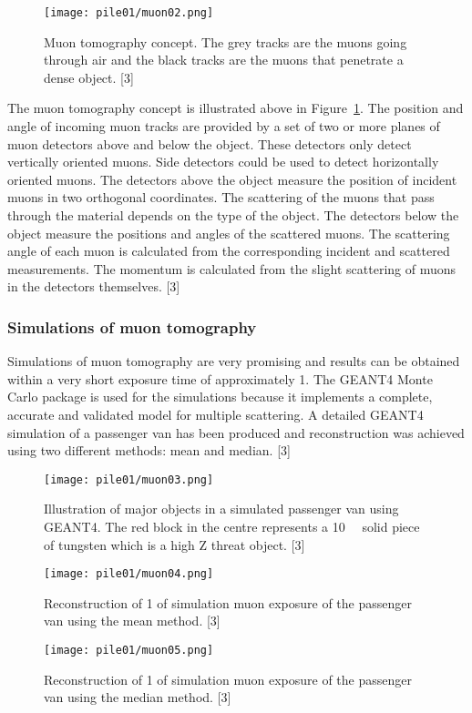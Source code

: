 \documentclass[a4paper]{article}
\begin{document}
\begin{figure}[h!]
  \texttt{[image: pile01/muon02.png]}
  \caption{Muon tomography concept. The grey tracks are the muons going through air and the black
tracks are the muons that penetrate a dense object. [3]}
  \label{muon02}
\end{figure}

The muon tomography concept is illustrated above in Figure~\ref{muon02}. The position and angle of incoming
muon tracks are provided by a set of two or more planes of muon detectors above and below the
object. These detectors only detect vertically oriented muons. Side detectors could be used to
detect horizontally oriented muons. The detectors above the object measure the position of incident
muons in two orthogonal coordinates. The scattering of the muons that pass through the material
depends on the type of the object. The detectors below the object measure the positions and angles
of the scattered muons. The scattering angle of each muon is calculated from the corresponding
incident and scattered measurements. The momentum is calculated from the slight scattering of
muons in the detectors themselves. [3]

\subsubsection{Simulations of muon tomography}
Simulations of muon tomography are very promising and results can be obtained within a very short
exposure time of approximately \unit{1}{\minute}. The GEANT4 Monte Carlo package is used for the simulations
because it implements a complete, accurate and validated model for multiple scattering. A detailed
GEANT4 simulation of a passenger van has been produced and reconstruction was achieved using
two different methods: mean and median. [3]

\begin{figure}[h!]
  \texttt{[image: pile01/muon03.png]}
  \caption{Illustration of major objects in a simulated passenger van using GEANT4. The red block in
the centre represents a \unit{10}{\cubic{\centi\metre}} solid piece of tungsten which is a high Z threat object. [3]}
\end{figure}
\begin{figure}[h!]
  \texttt{[image: pile01/muon04.png]}
  \caption{Reconstruction of \unit{1}{\minute} of simulation muon exposure of the passenger van using the
mean method. [3]}
  \label{muon04}
\end{figure}
\begin{figure}[h!]
  \texttt{[image: pile01/muon05.png]}
  \caption{Reconstruction of \unit{1}{\minute} of simulation muon exposure of the passenger van using the
median method. [3]}
  \label{muon05}
\end{figure}
\end{document}
